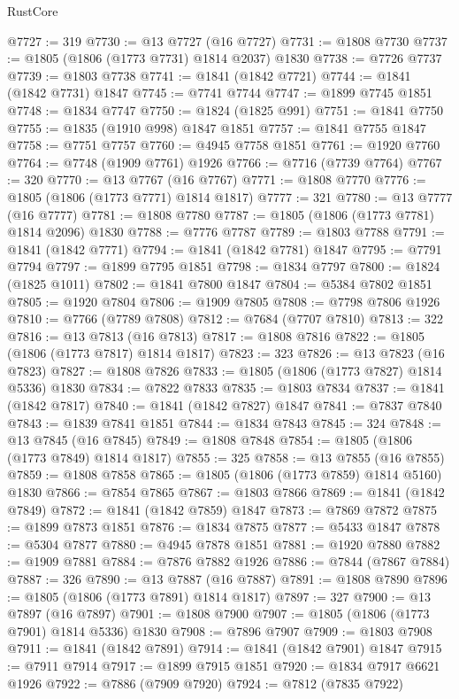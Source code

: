 \begin{lexlean}{RustCore}
\begin{coremodule}
@7727 := 319
@7730 := @13 @7727 (@16 @7727)
@7731 := @1808 @7730
@7737 := @1805 (@1806 (@1773 @7731) @1814 @2037) @1830
@7738 := @7726 @7737
@7739 := @1803 @7738
@7741 := @1841 (@1842 @7721)
@7744 := @1841 (@1842 @7731) @1847
@7745 := @7741 @7744
@7747 := @1899 @7745 @1851
@7748 := @1834 @7747
@7750 := @1824 (@1825 @991)
@7751 := @1841 @7750
@7755 := @1835 (@1910 @998) @1847 @1851
@7757 := @1841 @7755 @1847
@7758 := @7751 @7757
@7760 := @4945 @7758 @1851
@7761 := @1920 @7760
@7764 := @7748 (@1909 @7761) @1926
@7766 := @7716 (@7739 @7764)
@7767 := 320
@7770 := @13 @7767 (@16 @7767)
@7771 := @1808 @7770
@7776 := @1805 (@1806 (@1773 @7771) @1814 @1817)
@7777 := 321
@7780 := @13 @7777 (@16 @7777)
@7781 := @1808 @7780
@7787 := @1805 (@1806 (@1773 @7781) @1814 @2096) @1830
@7788 := @7776 @7787
@7789 := @1803 @7788
@7791 := @1841 (@1842 @7771)
@7794 := @1841 (@1842 @7781) @1847
@7795 := @7791 @7794
@7797 := @1899 @7795 @1851
@7798 := @1834 @7797
@7800 := @1824 (@1825 @1011)
@7802 := @1841 @7800 @1847
@7804 := @5384 @7802 @1851
@7805 := @1920 @7804
@7806 := @1909 @7805
@7808 := @7798 @7806 @1926
@7810 := @7766 (@7789 @7808)
@7812 := @7684 (@7707 @7810)
@7813 := 322
@7816 := @13 @7813 (@16 @7813)
@7817 := @1808 @7816
@7822 := @1805 (@1806 (@1773 @7817) @1814 @1817)
@7823 := 323
@7826 := @13 @7823 (@16 @7823)
@7827 := @1808 @7826
@7833 := @1805 (@1806 (@1773 @7827) @1814 @5336) @1830
@7834 := @7822 @7833
@7835 := @1803 @7834
@7837 := @1841 (@1842 @7817)
@7840 := @1841 (@1842 @7827) @1847
@7841 := @7837 @7840
@7843 := @1839 @7841 @1851
@7844 := @1834 @7843
@7845 := 324
@7848 := @13 @7845 (@16 @7845)
@7849 := @1808 @7848
@7854 := @1805 (@1806 (@1773 @7849) @1814 @1817)
@7855 := 325
@7858 := @13 @7855 (@16 @7855)
@7859 := @1808 @7858
@7865 := @1805 (@1806 (@1773 @7859) @1814 @5160) @1830
@7866 := @7854 @7865
@7867 := @1803 @7866
@7869 := @1841 (@1842 @7849)
@7872 := @1841 (@1842 @7859) @1847
@7873 := @7869 @7872
@7875 := @1899 @7873 @1851
@7876 := @1834 @7875
@7877 := @5433 @1847
@7878 := @5304 @7877
@7880 := @4945 @7878 @1851
@7881 := @1920 @7880
@7882 := @1909 @7881
@7884 := @7876 @7882 @1926
@7886 := @7844 (@7867 @7884)
@7887 := 326
@7890 := @13 @7887 (@16 @7887)
@7891 := @1808 @7890
@7896 := @1805 (@1806 (@1773 @7891) @1814 @1817)
@7897 := 327
@7900 := @13 @7897 (@16 @7897)
@7901 := @1808 @7900
@7907 := @1805 (@1806 (@1773 @7901) @1814 @5336) @1830
@7908 := @7896 @7907
@7909 := @1803 @7908
@7911 := @1841 (@1842 @7891)
@7914 := @1841 (@1842 @7901) @1847
@7915 := @7911 @7914
@7917 := @1899 @7915 @1851
@7920 := @1834 @7917 @6621 @1926
@7922 := @7886 (@7909 @7920)
@7924 := @7812 (@7835 @7922)

\end{coremodule}
\end{lexlean}
